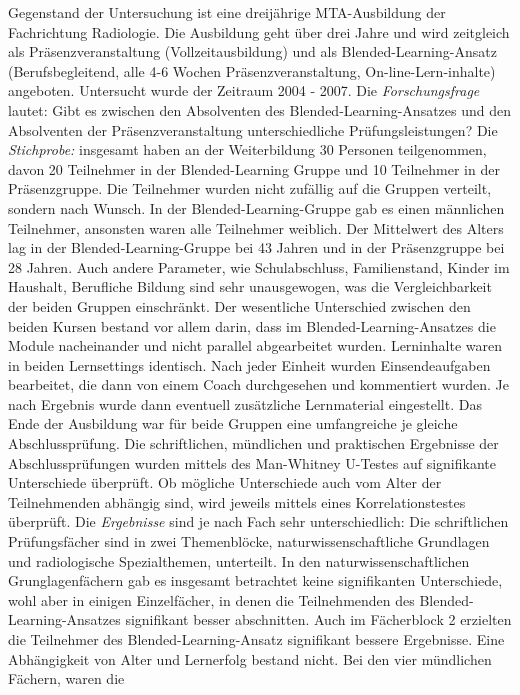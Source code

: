 \documentclass[12pt, bibliography=totoc]{scrartcl}
\begin{document}
Gegenstand der Untersuchung ist eine dreijährige MTA-Ausbildung der
Fachrichtung Radiologie. Die Ausbildung geht über drei Jahre und wird
zeitgleich als Präsenzveranstaltung (Vollzeitausbildung) und als
Blended-Learning-Ansatz (Berufsbegleitend, alle 4-6 Wochen
Präsenzveranstaltung, On-line-Lern-inhalte) angeboten. Untersucht wurde
der Zeitraum 2004 - 2007. Die \emph{Forschungsfrage} lautet: Gibt es
zwischen den Absolventen des Blended-Learning-Ansatzes und den
Absolventen der Präsenzveranstaltung unterschiedliche
Prüfungsleistungen? Die \emph{Stichprobe:} insgesamt haben an der
Weiterbildung 30 Personen teilgenommen, davon 20 Teilnehmer in der
Blended-Learning Gruppe und 10 Teilnehmer in der Präsenzgruppe. Die
Teilnehmer wurden nicht zufällig auf die Gruppen verteilt, sondern nach
Wunsch. In der Blended-Learning-Gruppe gab es einen männlichen
Teilnehmer, ansonsten waren alle Teilnehmer weiblich. Der Mittelwert des
Alters lag in der Blended-Learning-Gruppe bei 43 Jahren und in der
Präsenzgruppe bei 28 Jahren. Auch andere Parameter, wie Schulabschluss,
Familienstand, Kinder im Haushalt, Berufliche Bildung sind sehr
unausgewogen, was die Vergleichbarkeit der beiden Gruppen einschränkt.
Der wesentliche Unterschied zwischen den beiden Kursen bestand vor allem
darin, dass im Blended-Learning-Ansatzes die Module nacheinander und
nicht parallel abgearbeitet wurden. Lerninhalte waren in beiden
Lernsettings identisch. Nach jeder Einheit wurden Einsendeaufgaben
bearbeitet, die dann von einem Coach durchgesehen und kommentiert
wurden. Je nach Ergebnis wurde dann eventuell zusätzliche Lernmaterial
eingestellt. Das Ende der Ausbildung war für beide Gruppen eine
umfangreiche je gleiche Abschlussprüfung. Die schriftlichen, mündlichen
und praktischen Ergebnisse der Abschlussprüfungen wurden mittels des
Man-Whitney U-Testes auf signifikante Unterschiede überprüft. Ob
mögliche Unterschiede auch vom Alter der Teilnehmenden abhängig sind,
wird jeweils mittels eines Korrelationstestes überprüft. Die
\emph{Ergebnisse} sind je nach Fach sehr unterschiedlich: Die
schriftlichen Prüfungsfächer sind in zwei Themenblöcke,
naturwissenschaftliche Grundlagen und radiologische Spezialthemen,
unterteilt. In den naturwissenschaftlichen Grunglagenfächern gab es
insgesamt betrachtet keine signifikanten Unterschiede, wohl aber in
einigen Einzelfächer, in denen die Teilnehmenden des
Blended-Learning-Ansatzes signifikant besser abschnitten. Auch im
Fächerblock 2 erzielten die Teilnehmer des Blended-Learning-Ansatz
signifikant bessere Ergebnisse. Eine Abhängigkeit von Alter und
Lernerfolg bestand nicht. Bei den vier mündlichen Fächern, waren die
\end{document}
